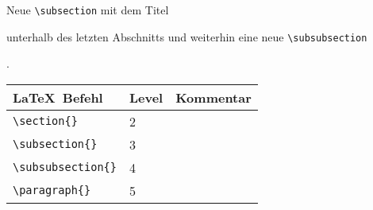 \begin{frame}[fragile]
	\Aufgabee
	Neue \lstinline[basicstyle=\normalfont\ttfamily\normalsize]|\subsection| mit dem Titel
		
		\textrm{}
		
	unterhalb des letzten Abschnitts und weiterhin eine neue \lstinline[basicstyle=\normalfont\ttfamily\normalsize]|\subsubsection|
		
		\textrm{}.
	\btVFill\Befehle
	\begin{center}
		\begin{tabular}{lll}
			\toprule
			\LaTeX\ Befehl					&	Level	&	Kommentar	\\ \midrule
			\lstinline|\section{}|			&	2		&	\\
			\lstinline|\subsection{}|		&	3		&	\\
			\lstinline|\subsubsection{}|	&	4		&	\\
			\lstinline|\paragraph{}|		&	5		&	\\
			\bottomrule
		\end{tabular}
	\end{center}
	\vspace{0.1cm}
\end{frame}

